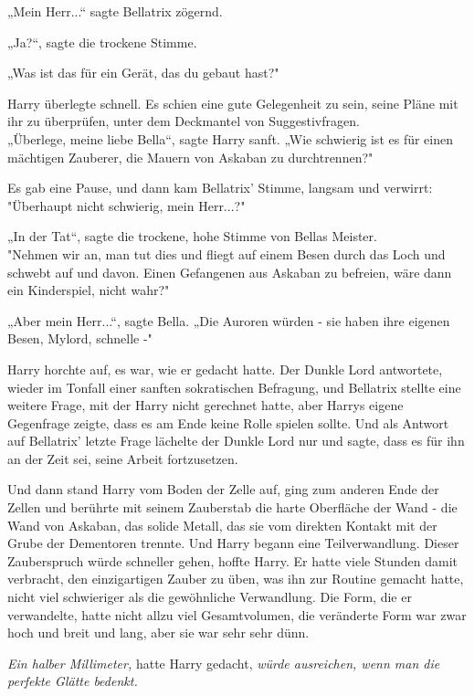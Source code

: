 {„Mein Herr...“ sagte Bellatrix zögernd.

„Ja?“, sagte die trockene Stimme.

„Was ist das für ein Gerät, das du gebaut hast?"

Harry überlegte schnell. Es schien eine gute Gelegenheit zu sein, seine Pläne mit ihr zu überprüfen, unter dem Deckmantel von Suggestivfragen.\\ „Überlege, meine liebe Bella“, sagte Harry sanft. „Wie schwierig ist es für einen mächtigen Zauberer, die Mauern von Askaban zu durchtrennen?"

Es gab eine Pause, und dann kam Bellatrix' Stimme, langsam und verwirrt:\\ "Überhaupt nicht schwierig, mein Herr...?"

„In der Tat“, sagte die trockene, hohe Stimme von Bellas Meister.\\ "Nehmen wir an, man tut dies und fliegt auf einem Besen durch das Loch und schwebt auf und davon. Einen Gefangenen aus Askaban zu befreien, wäre dann ein Kinderspiel, nicht wahr?"

„Aber mein Herr...“, sagte Bella. „Die Auroren würden - sie haben ihre eigenen Besen, Mylord, schnelle -"

Harry horchte auf, es war, wie er gedacht hatte. Der Dunkle Lord antwortete, wieder im Tonfall einer sanften sokratischen Befragung, und Bellatrix stellte eine weitere Frage, mit der Harry nicht gerechnet hatte, aber Harrys eigene Gegenfrage zeigte, dass es am Ende keine Rolle spielen sollte. Und als Antwort auf Bellatrix' letzte Frage lächelte der Dunkle Lord nur und sagte, dass es für ihn an der Zeit sei, seine Arbeit fortzusetzen.

Und dann stand Harry vom Boden der Zelle auf, ging zum anderen Ende der Zellen und berührte mit seinem Zauberstab die harte Oberfläche der Wand - die Wand von Askaban, das solide Metall, das sie vom direkten Kontakt mit der Grube der Dementoren trennte. Und Harry begann eine Teilverwandlung. Dieser Zauberspruch würde schneller gehen, hoffte Harry. Er hatte viele Stunden damit verbracht, den einzigartigen Zauber zu üben, was ihn zur Routine gemacht hatte, nicht viel schwieriger als die gewöhnliche Verwandlung. Die Form, die er verwandelte, hatte nicht allzu viel Gesamtvolumen, die veränderte Form war zwar hoch und breit und lang, aber sie war sehr sehr dünn.

\emph{Ein halber Millimeter,} hatte Harry gedacht, \emph{würde ausreichen, wenn man die perfekte Glätte bedenkt.}

}

